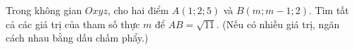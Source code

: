\begin{ex}
Trong không gian $Oxyz$, cho hai điểm $A(1;2;5)$ và $B(m;m-1;2)$. Tìm tất cả các giá trị của tham số thực $m$ để $AB=\sqrt{11}$. (Nếu có nhiều giá trị, ngăn cách nhau bằng dấu chấm phẩy.)
\end{ex}
